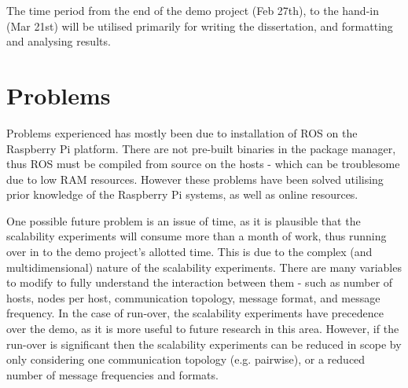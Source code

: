 \documentclass[11pt]{article}
\begin{document}
The time period from the end of the demo project (Feb 27th), to the hand-in (Mar 21st) will be utilised primarily for writing the dissertation, and formatting and analysing results.

\section{Problems}

Problems experienced has mostly been due to installation of ROS on the Raspberry Pi platform. There are not pre-built binaries in the package manager, thus ROS must be compiled from source on the hosts - which can be troublesome due to low RAM resources. However these problems have been solved utilising prior knowledge of the Raspberry Pi systems, as well as online resources.

One possible future problem is an issue of time, as it is plausible that the scalability experiments will consume more than a month of work, thus running over in to the demo project's allotted time. This is due to the complex (and multidimensional) nature of the scalability experiments. There are many variables to modify to fully understand the interaction between them - such as number of hosts, nodes per host, communication topology, message format, and message frequency. In the case of run-over, the scalability experiments have precedence over the demo, as it is more useful to future research in this area. However, if the run-over is significant then the scalability experiments can be reduced in scope by only considering one communication topology (e.g. pairwise), or a reduced number of message frequencies and formats.
\end{document}
